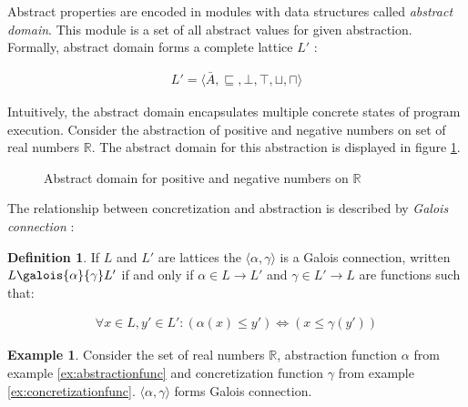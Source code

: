 \documentclass[12pt,final,oneside]{fithesis2}
\theoremstyle{definition}
\newtheorem{definition}{Definition}
\newtheorem{example}{Example}
\begin{document}
Abstract properties are encoded in modules with data structures called
\textit{abstract domain}. This module is a set of all abstract values
for given abstraction. Formally, abstract domain forms a complete
lattice $L'$ \cite{Constantini11-1}:

\begin{align*}
L' = \langle \bar{A}, \sqsubseteq, \bot, \top, \sqcup, \sqcap  \rangle
\end{align*}

Intuitively, the abstract domain encapsulates multiple concrete states of
program execution. Consider the abstraction of positive and negative
numbers on set of real numbers $\mathbb{R}$. The abstract domain for this
abstraction is displayed in figure \ref{fig:abstractdomain}.

\begin{figure}[ht]
\centering
{}
\caption{Abstract domain for positive and negative numbers on $\mathbb{R}$}
\label{fig:abstractdomain}
\end{figure}

The relationship between concretization and abstraction is described by
\textit{Galois connection} \cite{CousotCousot92-4}:

\begin{definition}
If $L$ and $L'$ are lattices the $\langle \alpha, \gamma \rangle$ is
a Galois connection, written $L \galois{\alpha}{\gamma} L'$ if and only if
$\alpha \in L \to L'$ and $\gamma \in L' \to L$ are functions such that:

\begin{align*}
\forall x \in L, y' \in L': (\alpha(x) \leq y') \iff (x \leq \gamma(y'))
\end{align*}
\end{definition}

\begin{example}
Consider the set of real numbers $\mathbb{R}$, abstraction function
$\alpha$ from example \ref{ex:abstractionfunc} and concretization function
$\gamma$ from example \ref{ex:concretizationfunc}.
$\langle \alpha, \gamma \rangle$ forms Galois connection.
\end{example}
\end{document}

